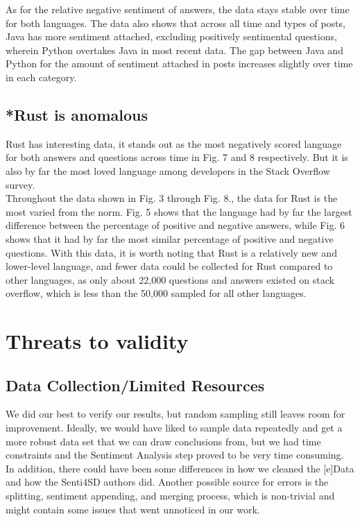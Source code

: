 \documentclass[conference]{IEEEtran}
\begin{document}
As for the relative negative sentiment of answers, the data stays stable over time for both languages. The data also shows that across all time and types of posts, Java has more sentiment attached, excluding positively sentimental questions, wherein Python overtakes Java in most recent data. The gap between Java and Python for the amount of sentiment attached in posts increases slightly over time in each category.\\

\subsection{*Rust is anomalous}
Rust has interesting data, it  stands out as the most negatively scored language for both answers and questions across time in Fig. 7 and 8 respectively. But it is also by far the most loved language among developers in the Stack Overflow survey. \\

Throughout the data shown in Fig. 3 through Fig. 8., the data for Rust is the most varied from the norm. Fig. 5 shows that the language had by far the largest difference between the percentage of positive and negative answers, while Fig. 6 shows that it had by far the most similar percentage of positive and negative questions. With this data, it is worth noting that Rust is a relatively new and lower-level language, and fewer data could be collected for Rust compared to other languages, as only about 22,000 questions and answers existed on stack overflow, which is less than the 50,000 sampled for all other languages.\\

\section{Threats to validity}

\subsection{Data Collection/Limited Resources}
We did our best to verify our results, but random sampling still leaves room for improvement. Ideally, we would have liked to sample data repeatedly and get a more robust data set that we can draw conclusions from, but we had time constraints and the Sentiment Analysis step proved to be very time consuming.\\

In addition, there could have been some differences in how we cleaned the [e]Data and how the Senti4SD authors did\cite{b18}. Another possible source for errors is the splitting, sentiment appending, and merging process, which is non-trivial and might contain some issues that went unnoticed in our work.\\
\end{document}

